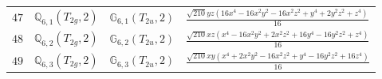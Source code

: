 \documentclass[fleqn,8pt,landscape]{jsarticle}
\begin{document}
\begin{table}[ht!]
\begin{center}
\begin{tabular}{cccl}
$ 47 $ & $ \mathbb{Q}_{6,1}(T_{2g},2) $ & $ \mathbb{G}_{6,1}(T_{2u},2) $ & $ \frac{\sqrt{210} y z \left(16 x^{4} - 16 x^{2} y^{2} - 16 x^{2} z^{2} + y^{4} + 2 y^{2} z^{2} + z^{4}\right)}{16} $ \\
$ 48 $ & $ \mathbb{Q}_{6,2}(T_{2g},2) $ & $ \mathbb{G}_{6,2}(T_{2u},2) $ & $ \frac{\sqrt{210} x z \left(x^{4} - 16 x^{2} y^{2} + 2 x^{2} z^{2} + 16 y^{4} - 16 y^{2} z^{2} + z^{4}\right)}{16} $ \\
$ 49 $ & $ \mathbb{Q}_{6,3}(T_{2g},2) $ & $ \mathbb{G}_{6,3}(T_{2u},2) $ & $ \frac{\sqrt{210} x y \left(x^{4} + 2 x^{2} y^{2} - 16 x^{2} z^{2} + y^{4} - 16 y^{2} z^{2} + 16 z^{4}\right)}{16} $ \\
 \hline \hline
\end{tabular}
\end{center}
\end{table}
\end{document}
